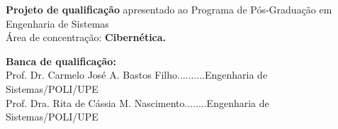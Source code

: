 \begin{center}
\begin{center}
\end{center}


\begin{flushright}
\vspace{0.5in}
\parbox{3.15in}
 {\textbf{Projeto de qualificação} apresentado ao Programa de Pós-Graduação em Engenharia de Sistemas\\
 Área de concentração: \textbf{Cibernética.} }
\end{flushright}



\vspace{0.5in}

\begin{flushleft}

\vspace{1ex} \textbf{Banca de qualificação:} \\

\vspace{1ex} Prof. Dr.  Carmelo José A. Bastos Filho..........Engenharia de Sistemas/POLI/UPE \\
\vspace{1ex} Prof. Dra. Rita de Cássia M. Nascimento........Engenharia de Sistemas/POLI/UPE

\end{flushleft}


\vspace{0.2in}
\dataQualif

\end{center}

